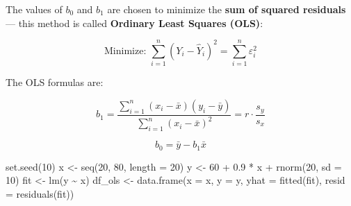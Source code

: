 \documentclass[
  12pt,
  letterpaper,
]{book}
\newenvironment{Shaded}{\begin{snugshade}}{\end{snugshade}}
\newcommand{\AttributeTok}[1]{\textcolor[rgb]{0.40,0.45,0.13}{#1}}
\newcommand{\DecValTok}[1]{\textcolor[rgb]{0.68,0.00,0.00}{#1}}
\newcommand{\FloatTok}[1]{\textcolor[rgb]{0.68,0.00,0.00}{#1}}
\newcommand{\FunctionTok}[1]{\textcolor[rgb]{0.28,0.35,0.67}{#1}}
\newcommand{\NormalTok}[1]{\textcolor[rgb]{0.00,0.23,0.31}{#1}}
\newcommand{\OtherTok}[1]{\textcolor[rgb]{0.00,0.23,0.31}{#1}}
\newcommand{\SpecialCharTok}[1]{\textcolor[rgb]{0.37,0.37,0.37}{#1}}
\begin{document}
The values of \(b_0\) and \(b_1\) are chosen to minimize the \textbf{sum
of squared residuals} --- this method is called \textbf{Ordinary Least
Squares (OLS)}:

\[\text{Minimize: } \sum_{i=1}^{n}(Y_i - \hat{Y}_i)^2 = \sum_{i=1}^{n}\varepsilon_i^2\]

The OLS formulas are:

\[b_1 = \frac{\sum_{i=1}^{n}(x_i - \bar{x})(y_i - \bar{y})}
             {\sum_{i=1}^{n}(x_i - \bar{x})^2}
       = r \cdot \frac{s_y}{s_x}\]

\[b_0 = \bar{y} - b_1 \bar{x}\]

\begin{Shaded}
\begin{Highlighting}[]
\FunctionTok{set.seed}\NormalTok{(}\DecValTok{10}\NormalTok{)}
\NormalTok{x }\OtherTok{\textless{}{-}} \FunctionTok{seq}\NormalTok{(}\DecValTok{20}\NormalTok{, }\DecValTok{80}\NormalTok{, }\AttributeTok{length =} \DecValTok{20}\NormalTok{)}
\NormalTok{y }\OtherTok{\textless{}{-}} \DecValTok{60} \SpecialCharTok{+} \FloatTok{0.9} \SpecialCharTok{*}\NormalTok{ x }\SpecialCharTok{+} \FunctionTok{rnorm}\NormalTok{(}\DecValTok{20}\NormalTok{, }\AttributeTok{sd =} \DecValTok{10}\NormalTok{)}
\NormalTok{fit }\OtherTok{\textless{}{-}} \FunctionTok{lm}\NormalTok{(y }\SpecialCharTok{\textasciitilde{}}\NormalTok{ x)}
\NormalTok{df\_ols }\OtherTok{\textless{}{-}} \FunctionTok{data.frame}\NormalTok{(}\AttributeTok{x =}\NormalTok{ x, }\AttributeTok{y =}\NormalTok{ y,}
                     \AttributeTok{yhat =} \FunctionTok{fitted}\NormalTok{(fit),}
                     \AttributeTok{resid =} \FunctionTok{residuals}\NormalTok{(fit))}


\end{Highlighting}
\end{Shaded}
\end{document}
